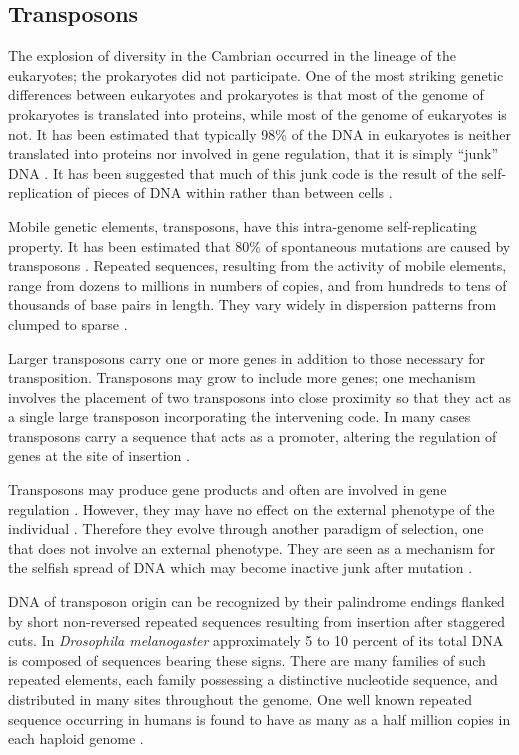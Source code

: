 \subsection{Transposons}

The explosion of diversity in the Cambrian occurred in the lineage of
the eukaryotes; the prokaryotes did not participate.
One of the most striking genetic differences between eukaryotes and
prokaryotes is that most of the genome of prokaryotes is translated into
proteins, while most of the genome of eukaryotes is not.  It has been
estimated that typically 98\% of the DNA in eukaryotes is neither
translated into proteins nor involved in gene regulation, that it is
simply ``junk'' DNA \cite{Thom}.  It has been suggested that much of
this junk code is the result of the self-replication of pieces of DNA
within rather than between cells \cite{DoSa,OrCr}.

Mobile genetic elements, transposons, have this intra-genome
self-replicating property.  It has been estimated that 80\% of
spontaneous mutations are caused by transposons \cite{Chao,Gree}.
Repeated sequences, resulting from the activity of mobile elements,
range from dozens to millions in numbers of copies, and from hundreds
to tens of thousands of base pairs in length.  They vary widely in
dispersion patterns from clumped to sparse \cite{JeSc}.

Larger transposons carry one or more genes in addition to those necessary
for transposition.  Transposons may grow to include more genes; one
mechanism involves the placement of two transposons into close proximity
so that they act as a single large transposon incorporating the intervening
code.  In many cases transposons carry a sequence that acts as a promoter,
altering the regulation of genes at the site of insertion \cite{Syva}.

Transposons may produce gene products and often are
involved in gene regulation \cite{DaBr}.  However, they may have no effect
on the external phenotype of the individual \cite{DoSa}.  Therefore they
evolve through another paradigm of selection, one that does not involve
an external phenotype.  They are seen as a mechanism for the selfish
spread of DNA which may become inactive junk after mutation \cite{OrCr}.

DNA of transposon origin can be recognized by their palindrome endings
flanked by short non-reversed repeated sequences resulting from
insertion after staggered cuts.  In {\it Drosophila melanogaster}
approximately 5 to 10 percent of its total DNA is composed of
sequences bearing these signs.  There are many families of such
repeated elements, each family possessing a distinctive nucleotide
sequence, and distributed in many sites throughout the genome.  One
well known repeated sequence occurring in humans is found to have as
many as a half million copies in each haploid genome \cite{Stri}.

